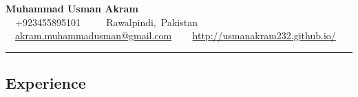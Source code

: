 \documentclass[10pt,letterpaper]{article}
\begin{document}
\begin{center}
{\LARGE \textbf{Muhammad Usman Akram}} \\
\ \ +923455895101 \ \ \textbullet
\ \ Rawalpindi,\ Pakistan
\\
\ \ \href{mailto:akram.muhammadusman@gmail.com}{akram.muhammadusman@gmail.com}
\ \textbullet
\ \ \href{http://usmanakram232.github.io/}{http://usmanakram232.github.io/}
\end{center}

\hrule
\vspace{-0.4em}
\subsection*{Experience}
\end{document}
